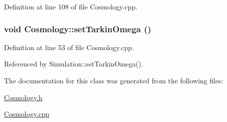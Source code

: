 Definition at line 108 of file Cosmology.cpp.

\subsubsection[{setTarkinOmega}]{\setlength{\rightskip}{0pt plus 5cm}void Cosmology::setTarkinOmega ()}\label{classCosmology_a208a7205e5b4ca66f65d5e9a5a193b81}


Definition at line 53 of file Cosmology.cpp.



Referenced by Simulation::setTarkinOmega().



The documentation for this class was generated from the following files:\begin{DoxyCompactItemize}
\item 
\hyperlink{Cosmology_8h}{Cosmology.h}\item 
\hyperlink{Cosmology_8cpp}{Cosmology.cpp}\end{DoxyCompactItemize}
